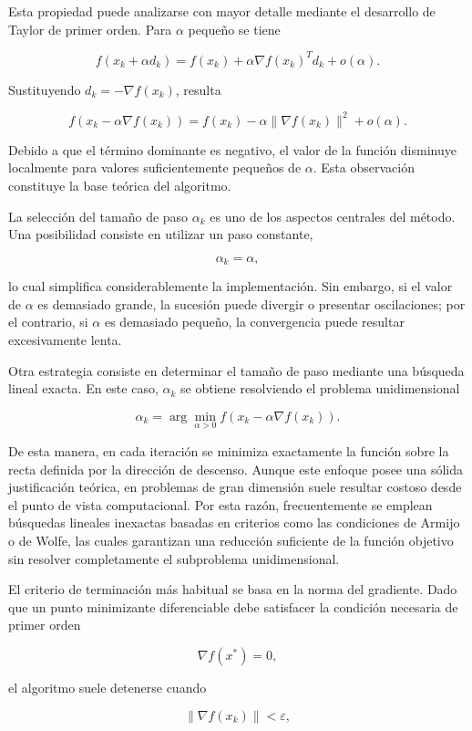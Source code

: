 \documentclass[
  spanish,
  us-letterpaper,
  DIV=11,
  numbers=noendperiod]{scrreprt}
\begin{document}
Esta propiedad puede analizarse con mayor detalle mediante el desarrollo
de Taylor de primer orden. Para \(\alpha\) pequeño se tiene

\[
f(x_k+\alpha d_k)
=
f(x_k)
+
\alpha \nabla f(x_k)^T d_k
+
o(\alpha).
\]

Sustituyendo \(d_k=-\nabla f(x_k)\), resulta

\[
f(x_k-\alpha \nabla f(x_k))
=
f(x_k)
-
\alpha \|\nabla f(x_k)\|^2
+
o(\alpha).
\]

Debido a que el término dominante es negativo, el valor de la función
disminuye localmente para valores suficientemente pequeños de
\(\alpha\). Esta observación constituye la base teórica del algoritmo.

La selección del tamaño de paso \(\alpha_k\) es uno de los aspectos
centrales del método. Una posibilidad consiste en utilizar un paso
constante,

\[
\alpha_k = \alpha,
\]

lo cual simplifica considerablemente la implementación. Sin embargo, si
el valor de \(\alpha\) es demasiado grande, la sucesión puede divergir o
presentar oscilaciones; por el contrario, si \(\alpha\) es demasiado
pequeño, la convergencia puede resultar excesivamente lenta.

Otra estrategia consiste en determinar el tamaño de paso mediante una
búsqueda lineal exacta. En este caso, \(\alpha_k\) se obtiene
resolviendo el problema unidimensional

\[
\alpha_k
=
\arg\min_{\alpha>0}
f(x_k-\alpha \nabla f(x_k)).
\]

De esta manera, en cada iteración se minimiza exactamente la función
sobre la recta definida por la dirección de descenso. Aunque este
enfoque posee una sólida justificación teórica, en problemas de gran
dimensión suele resultar costoso desde el punto de vista computacional.
Por esta razón, frecuentemente se emplean búsquedas lineales inexactas
basadas en criterios como las condiciones de Armijo o de Wolfe, las
cuales garantizan una reducción suficiente de la función objetivo sin
resolver completamente el subproblema unidimensional.

El criterio de terminación más habitual se basa en la norma del
gradiente. Dado que un punto minimizante diferenciable debe satisfacer
la condición necesaria de primer orden

\[
\nabla f(x^\ast)=0,
\]

el algoritmo suele detenerse cuando

\[
\|\nabla f(x_k)\| < \varepsilon,
\]
\end{document}
